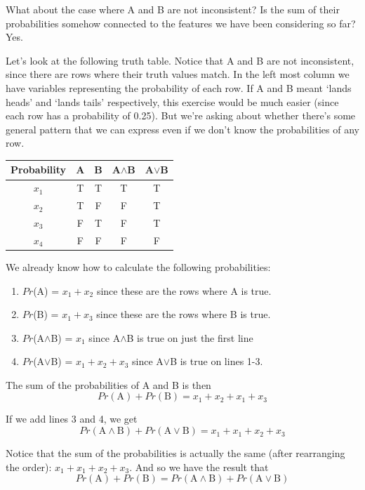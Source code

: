 \documentclass[]{tufte-book}
\providecommand{\tightlist}{%
  \setlength{\itemsep}{0pt}\setlength{\parskip}{0pt}}
\begin{document}
What about the case where A and B are not inconsistent? Is the sum of their probabilities somehow connected to the features we have been considering so far? Yes.

Let's look at the following truth table. Notice that A and B are not inconsistent, since there are rows where their truth values match. In the left most column we have variables representing the probability of each row. If A and B meant `lands heads' and `lands tails' respectively, this exercise would be much easier (since each row has a probability of 0.25). But we're asking about whether there's some general pattern that we can express even if we don't know the probabilities of any row.

\begin{longtable}[]{@{}ccccc@{}}
\toprule
Probability & A & B & A\(\wedge\)B & A\(\vee\)B\tabularnewline
\midrule
\endhead
\(x_1\) & T & T & T & T\tabularnewline
\(x_2\) & T & F & F & T\tabularnewline
\(x_3\) & F & T & F & T\tabularnewline
\(x_4\) & F & F & F & F\tabularnewline
\bottomrule
\end{longtable}

We already know how to calculate the following probabilities:

\begin{enumerate}
\def\labelenumi{\arabic{enumi}.}
\tightlist
\item
  \(Pr\)(A) = \(x_1 + x_2\) since these are the rows where A is true.
\item
  \(Pr\)(B) = \(x_1 + x_3\) since these are the rows where B is true.
\item
  \(Pr\)(A\(\wedge\)B) = \(x_1\) since A\(\wedge\)B is true on just the first line
\item
  \(Pr\)(A\(\vee\)B) = \(x_1 + x_2 + x_3\) since A\(\vee\)B is true on lines 1-3.
\end{enumerate}

The sum of the probabilities of A and B is then
\[
Pr(\text{A}) + Pr(\text{B}) = x_1 + x_2 + x_1 + x_3
\]

If we add lines 3 and 4, we get
\[
Pr(\text{A}\wedge\text{B}) + Pr(\text{A}\vee\text{B}) = x_1 + x_1 + x_2 + x_3
\]

Notice that the sum of the probabilities is actually the same (after rearranging the order): \(x_1 + x_1 + x_2 + x_3\). And so we have the result that
\[
Pr(\text{A}) + Pr(\text{B}) = Pr(\text{A}\wedge\text{B}) + Pr(\text{A}\vee\text{B})
\]
\end{document}
